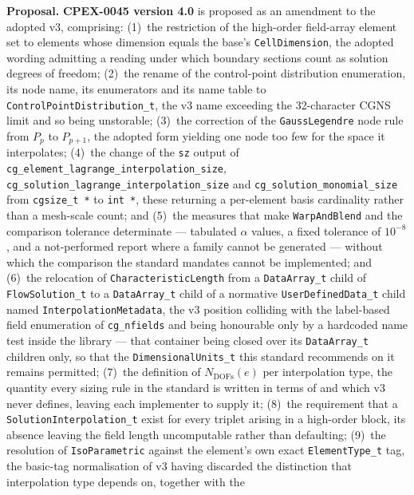\documentclass[11pt,letterpaper]{article}
\newif\ifvfourdraft
\newenvironment{v4block}{\ifvfourdraft\color{v4violet}\fi\ignorespaces}{\par}
\begin{document}
{\begin{v4block}
\medskip
\bigskip
\begin{motionbox}
\textbf{Proposal.}
\textbf{CPEX-0045 version 4.0} is proposed as an amendment to the adopted v3,
comprising: (1)~the restriction of the
high-order field-array element set to elements whose dimension equals the base's
\texttt{CellDimension}, the adopted wording admitting a reading under which
boundary sections count as solution degrees of freedom; (2)~the rename of the
control-point distribution enumeration, its node name, its enumerators and its
name table to \texttt{ControlPointDistribution\_t}, the v3 name exceeding the
32-character CGNS limit and so being unstorable; (3)~the correction of the
\texttt{GaussLegendre} node rule from $P_p$ to $P_{p+1}$, the adopted form
yielding one node too few for the space it interpolates; (4)~the change of the
\texttt{sz} output of \texttt{cg\_element\_lagrange\_interpolation\_size},
\texttt{cg\_solution\_lagrange\_interpolation\_size} and
\texttt{cg\_solution\_monomial\_size} from \texttt{cgsize\_t *} to \texttt{int *},
these returning a per-element basis cardinality rather than a mesh-scale count;
and (5)~the measures that make \texttt{WarpAndBlend} and the comparison tolerance
determinate --- tabulated $\alpha$ values, a fixed tolerance of $10^{-8}$, and a
not-performed report where a family cannot be generated --- without which the
comparison the standard mandates cannot be implemented; and (6)~the relocation of
\texttt{CharacteristicLength} from a \texttt{DataArray\_t} child of
\texttt{FlowSolution\_t} to a \texttt{DataArray\_t} child of a normative
\texttt{UserDefinedData\_t} child named \texttt{InterpolationMetadata}, the v3
position colliding with the label-based field enumeration of
\texttt{cg\_nfields} and being honourable only by a hardcoded name test inside
the library --- that container being closed over its \texttt{DataArray\_t}
children only, so that the \texttt{DimensionalUnits\_t} this standard recommends
on it remains permitted; (7)~the definition of $N_\mathrm{DOFs}(e)$ per
interpolation type, the quantity every sizing rule in the standard is written in
terms of and which v3 never defines, leaving each implementer to supply it;
(8)~the requirement that
a \texttt{SolutionInterpolation\_t} exist for every triplet arising in a
high-order block, its absence leaving the field length uncomputable rather than
defaulting; (9)~the resolution of \texttt{IsoParametric} against the element's own
exact \texttt{ElementType\_t} tag, the basic-tag normalisation of v3 having
discarded the distinction that interpolation type depends on, together with the

\end{motionbox}
\end{v4block}}
\end{document}
